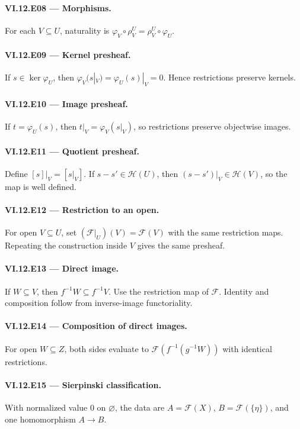 \paragraph{VI.12.E08 --- Morphisms.}
For each $V\subseteq U$, naturality is $\varphi_V\circ\rho^U_V=\rho^U_V\circ\varphi_U$.

\paragraph{VI.12.E09 --- Kernel presheaf.}
If $s\in\ker\varphi_U$, then $\varphi_V(s|_V)=\varphi_U(s)|_V=0$.  Hence restrictions preserve kernels.

\paragraph{VI.12.E10 --- Image presheaf.}
If $t=\varphi_U(s)$, then $t|_V=\varphi_V(s|_V)$, so restrictions preserve objectwise images.

\paragraph{VI.12.E11 --- Quotient presheaf.}
Define $[s]|_V=[s|_V]$.  If $s-s'\in\mathcal H(U)$, then $(s-s')|_V\in\mathcal H(V)$, so the map is well defined.

\paragraph{VI.12.E12 --- Restriction to an open.}
For open $V\subseteq U$, set $(\mathcal F|_U)(V)=\mathcal F(V)$ with the same restriction maps.  Repeating the construction inside $V$ gives the same presheaf.

\paragraph{VI.12.E13 --- Direct image.}
If $W\subseteq V$, then $f^{-1}W\subseteq f^{-1}V$.  Use the restriction map of $\mathcal F$.  Identity and composition follow from inverse-image functoriality.

\paragraph{VI.12.E14 --- Composition of direct images.}
For open $W\subseteq Z$, both sides evaluate to $\mathcal F(f^{-1}(g^{-1}W))$ with identical restrictions.

\paragraph{VI.12.E15 --- Sierpinski classification.}
With normalized value $0$ on $\varnothing$, the data are $A=\mathcal F(X)$, $B=\mathcal F(\{\eta\})$, and one homomorphism $A\to B$.

